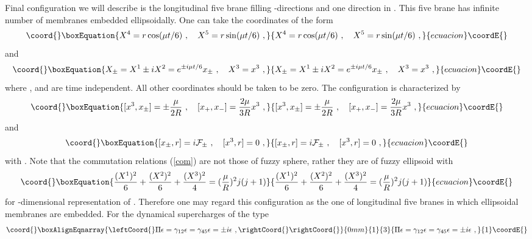 \documentclass[a4paper,12pt]{article}
\begin{document}
Final configuration we will describe is the longitudinal five
brane filling \coordHE{}-directions and one direction in
\coordHE{}. This five brane has infinite number of membranes
embedded ellipsoidally. One can take the coordinates of the form
\begin{equation}\coord{}\boxEquation{
X^{4}=r \cos(\mu t/6)~, \ \ \ X^{5}=r \sin(\mu t/6)~,
}{
X^{4}=r \cos(\mu t/6)~, \ \ \ X^{5}=r \sin(\mu t/6)~,
}{ecuacion}\coordE{}\end{equation}
and
\begin{equation}\coord{}\boxEquation{
X_{\pm} = X^1\pm i X^2 = e^{\pm i\mu t/6} x_{\pm}~,\ \ \ X^3 =
x^3~,
}{
X_{\pm} = X^1\pm i X^2 = e^{\pm i\mu t/6} x_{\pm}~,\ \ \ X^3 =
x^3~,
}{ecuacion}\coordE{}\end{equation}
where \coordHE{}, and \coordHE{} are time independent. All other
coordinates should be taken to be zero. The configuration is
characterized by
\begin{equation}\coord{}\boxEquation{
[x^3, x_{\pm} ] = \pm \frac{\mu}{2 R}~, \ \ \ [x_+, x_-]=
\frac{2\mu}{3R} x^3~, \label{com}
}{
[x^3, x_{\pm} ] = \pm \frac{\mu}{2 R}~, \ \ \ [x_+, x_-]=
\frac{2\mu}{3R} x^3~, }{ecuacion}\coordE{}\end{equation}
and
\begin{equation}\coord{}\boxEquation{
[x_\pm, r ] = i {\cal F}_{\pm}~, \ \ \
[x^3, r]= 0~,
}{
[x_\pm, r ] = i {\cal F}_{\pm}~, \ \ \
[x^3, r]= 0~,
}{ecuacion}\coordE{}\end{equation}
with \coordHE{}. Note that the commutation
relations (\ref{com}) are not those of fuzzy sphere, rather they
are of fuzzy ellipsoid with
\begin{equation}\coord{}\boxEquation{
\frac{(X^1)^2}{6}+\frac{(X^2)^2}{6}+\frac{(X^3)^2}{4}=(\frac{\mu}{R})^2
j(j+1)
}{
\frac{(X^1)^2}{6}+\frac{(X^2)^2}{6}+\frac{(X^3)^2}{4}=(\frac{\mu}{R})^2
j(j+1)
}{ecuacion}\coordE{}\end{equation}
for \coordHE{}-dimensional representation of \coordHE{}. Therefore one
may regard this configuration as the one of longitudinal five
branes in which ellipsoidal membranes are embedded. For the
dynamical supercharges of the type
\begin{eqnarray}\coord{}\boxAlignEqnarray{\leftCoord{}
\Pi \epsilon=  \gamma_{12}\epsilon =  \gamma_{45}\epsilon = \pm
i\epsilon~, \rightCoord{}
\rightCoord{}}{0mm}{1}{3}{
\Pi \epsilon=  \gamma_{12}\epsilon =  \gamma_{45}\epsilon = \pm
i\epsilon~, 
}{1}\coordE{}\end{eqnarray}
\end{document}

